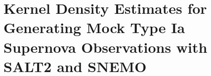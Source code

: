\chapter{Kernel Density Estimates for Generating Mock Type Ia Supernova Observations with SALT2 and SNEMO}